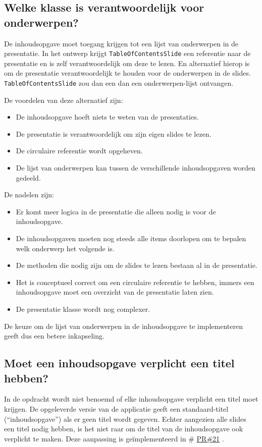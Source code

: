 \documentclass[a4paper]{article}
\makeatletter
\newcommand*{\repo}{\begingroup\@makeother\#\@repo}
\newcommand*{\@repo}[2]{%
  \href{https://github.com/DanielSchiavini/design-patterns-assignment/#1}{#2}%
  \endgroup}
\newcommand{\PR}[1]{\repo{pull/#1}{PR\##1}}
\newcommand{\question}[1]{
  \subsection{#1}
}
\newcommand{\code}[1]{\lstinline[columns=fixed]{#1}}
\makeatother
\begin{document}
    \question{Welke klasse is verantwoordelijk voor onderwerpen?}
		De inhoudsopgave moet toegang krijgen tot een lijst van onderwerpen in de presentatie.
		In het ontwerp krijgt \code{TableOfContentsSlide} een referentie naar de presentatie en is zelf verantwoordelijk om deze te lezen.
		En alternatief hierop is om de presentatie verantwoordelijk te houden voor de onderwerpen in de slides.
		\code{TableOfContentsSlide} zou dan een dan een onderwerpen-lijst ontvangen.

		De voordelen van deze alternatief zijn:
		\begin{itemize}
			\item De inhoudsopgave hoeft niets te weten van de presentaties.
			\item De presentatie is verantwoordelijk om zijn eigen slides te lezen.
			\item De circulaire referentie wordt opgeheven.
			\item De lijst van onderwerpen kan tussen de verschillende inhoudsopgaven worden gedeeld.
		\end{itemize}

		De nadelen zijn:
		\begin{itemize}
			\item Er komt meer logica in de presentatie die alleen nodig is voor de in\-houds\-op\-gave.
			\item De inhoudsopgaven moeten nog steeds alle items doorlopen om te bepalen welk onderwerp het volgende is.
			\item De methoden die nodig zijn om de slides te lezen bestaan al in de presentatie.
			\item Het is conceptueel correct om een circulaire referentie te hebben, immers een inhoudsopgave moet een overzicht van de presentatie laten zien.
			\item De presentatie klasse wordt nog complexer.
		\end{itemize}

		De keuze om de lijst van onderwerpen in de inhoudsopgave te implementeren geeft dus een betere inkapseling.

    \question{Moet een inhoudsopgave verplicht een titel hebben?}
		In de opdracht wordt niet benoemd of elke inhoudsopgave verplicht een titel moet krijgen.
		De opgeleverde versie van de applicatie geeft een standaard-titel (``inhoudsopgave'') als er geen titel wordt gegeven.
		Echter aangezien alle slides een titel nodig hebben, is het niet raar om de titel van de inhoudsopgave ook verplicht te maken.
		Deze aanpassing is geïmplementeerd in \PR{21}.
    
\end{document}

